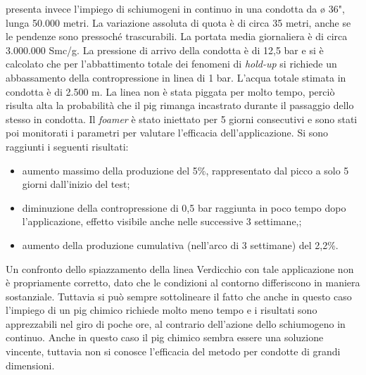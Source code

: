 \textcite{passucci2015foamer} presenta invece l'impiego di schiumogeni in continuo in una condotta da ø 36", lunga 50.000 metri. La variazione assoluta di quota è di circa 35 metri, anche se le pendenze sono pressoché trascurabili. La portata media giornaliera è di circa 3.000.000 Smc/g. La pressione di arrivo della condotta è di 12,5 bar e si è calcolato che per l'abbattimento totale dei fenomeni di \textit{hold-up} si richiede un abbassamento della contropressione in linea di 1 bar. L'acqua totale stimata in condotta è di 2.500 m. La linea non è stata piggata per molto tempo, perciò risulta alta la probabilità che il pig rimanga incastrato durante il passaggio dello stesso in condotta. Il \textit{foamer} è stato iniettato per 5 giorni consecutivi e sono stati poi monitorati i parametri per valutare l'efficacia dell'applicazione. Si sono raggiunti i seguenti risultati:
\begin{itemize}
\item aumento massimo della produzione del 5\%, rappresentato dal picco a solo 5 giorni dall'inizio del test;
\item diminuzione della contropressione di 0,5 bar raggiunta in poco tempo dopo l'applicazione, effetto visibile anche nelle successive 3 settimane,;
\item aumento della produzione cumulativa (nell'arco di 3 settimane) del 2,2\%.
\end{itemize}
Un confronto dello spiazzamento della linea Verdicchio con tale applicazione non è propriamente corretto, dato che le condizioni al contorno differiscono in maniera sostanziale. Tuttavia si può sempre sottolineare il fatto che anche in questo caso l'impiego di un pig chimico richiede molto meno tempo e i risultati sono apprezzabili nel giro di poche ore, al contrario dell'azione dello schiumogeno in continuo. Anche in questo caso il pig chimico sembra essere una soluzione vincente, tuttavia non si conosce l'efficacia del metodo per condotte di grandi dimensioni.

